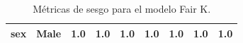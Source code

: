 \documentclass[oneside,openright,titlepage,numbers=noenddot,openany,headinclude,footinclude=true,
cleardoublepage=empty,abstractoff,BCOR=5mm,paper=a4,fontsize=12pt,main=spanish]{scrreprt}
\begin{document}
\begin{table}[H]
{\begin{tabular}{|c|c|c|c|c|c|c|c|c|}
\textbf{sex}                                                      & Male                                                               & {\color[HTML]{3166FF} 1.0}                                       & {\color[HTML]{3166FF} 1.0}                                       & {\color[HTML]{3166FF} 1.0}                                       & {\color[HTML]{3166FF} 1.0}                                       & {\color[HTML]{3166FF} 1.0}                                       & {\color[HTML]{3166FF} 1.0}                                       & {\color[HTML]{3166FF} 1.0}                                       \\ \hline
\end{tabular}
}
\caption{Métricas de sesgo para el modelo Fair K.}
\label{tab:sesgofairk}
\end{table}
\end{document}
